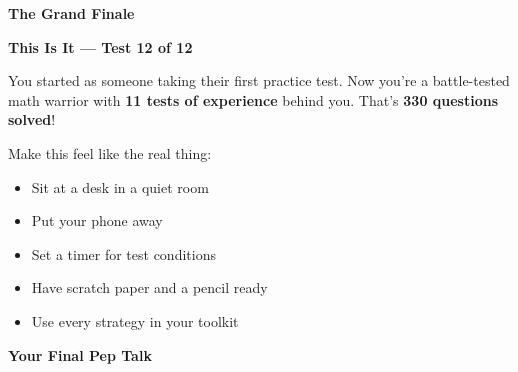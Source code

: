 \clearpage
\thispagestyle{empty}
{\sffamily

\begin{center}
{\fontsize{22}{26}\selectfont\bfseries\color{funTeal} \faTrophy\hspace{3mm}The Grand Finale\hspace{3mm}\faTrophy}

\vspace{2mm}
{\color{funGray}\hrulefill}
\end{center}

\vspace{3mm}

\begin{tcolorbox}[
    enhanced,
    colback=funTealLight,
    colframe=funTeal!50,
    arc=10pt,
    boxrule=1.5pt,
    left=6mm, right=6mm, top=5mm, bottom=5mm,
]
{\large\bfseries\color{funTealDark} \faRocket\hspace{2mm}This Is It — Test 12 of 12}

\vspace{2mm}

You started as someone taking their first practice test. Now you're a battle-tested math warrior with \textbf{11 tests of experience} behind you. That's \textbf{330 questions solved}!

\vspace{3mm}

Make this feel like the real thing:

\begin{itemize}[leftmargin=6mm, itemsep=3pt]
    \item[\textcolor{funTeal}{\faStar}] Sit at a desk in a quiet room
    \item[\textcolor{funTeal}{\faStar}] Put your phone away
    \item[\textcolor{funTeal}{\faStar}] Set a timer for test conditions
    \item[\textcolor{funTeal}{\faStar}] Have scratch paper and a pencil ready
    \item[\textcolor{funTeal}{\faStar}] Use every strategy in your toolkit
\end{itemize}
\end{tcolorbox}

\vspace{3mm}

\begin{tcolorbox}[
    enhanced,
    colback=funYellowLight,
    colframe=funYellow!60,
    arc=10pt,
    boxrule=1pt,
    left=6mm, right=6mm, top=4mm, bottom=4mm,
]
{\bfseries\color{funYellowDark} \faLightbulb\hspace{2mm}Your Final Pep Talk}


\end{tcolorbox}}
